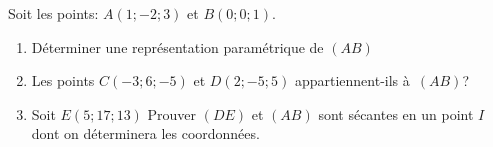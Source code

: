 \begin{exercice}
Soit les points: $A(1;-2;3)$ et $B(0;0;1)$.
  \begin{enumerate}
  \item D\'eterminer une repr\'esentation param\'etrique de $(AB)$\label{a}
  \item Les points $C(-3;6;-5)$ et $D(2;-5;5)$ appartiennent-ils \label{b}
    \`a~$(AB)$?

  \item Soit $E(5;17;13)$ Prouver $(DE)$ et $(AB)$ sont s\'ecantes en
    un point $I$ dont on d\'eterminera les coordonn\'ees. \label{c}

  \end{enumerate}
\hfill {}

 
\end{exercice}
